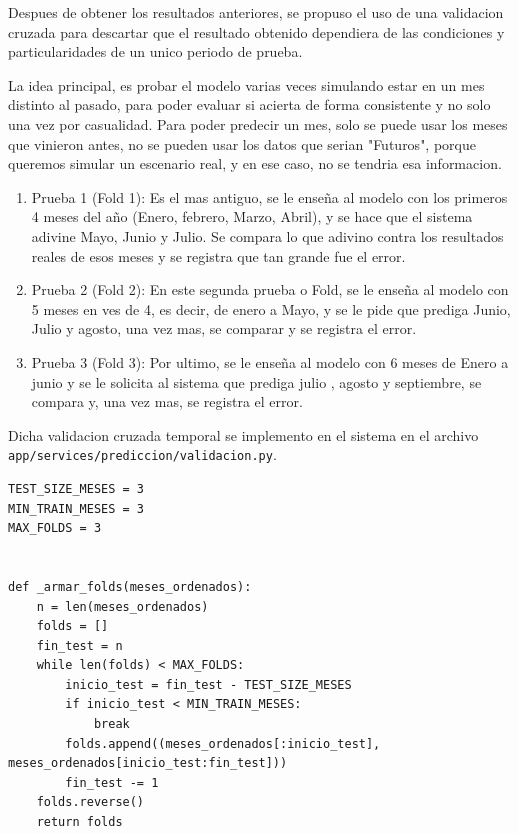 Despues de obtener los resultados anteriores, se propuso el uso de una validacion cruzada para descartar que el resultado obtenido dependiera de las condiciones y particularidades de un unico periodo de prueba.

La idea principal, es probar el modelo varias veces simulando estar en un mes distinto al pasado, para poder evaluar si acierta de forma consistente y no solo una vez por casualidad. Para poder predecir un mes, solo se puede usar los meses que vinieron antes, no se pueden usar los datos que serian "Futuros", porque queremos simular un escenario real, y en ese caso, no se tendria esa informacion.


\begin{enumerate}
    \item Prueba 1 (Fold 1): Es el mas antiguo, se le enseña al modelo con los primeros 4 meses del año (Enero, febrero, Marzo, Abril), y se hace que el sistema adivine Mayo, Junio y Julio. Se compara lo que adivino contra los resultados reales de esos meses y se registra que tan grande fue el error.
    \item Prueba 2 (Fold 2): En este segunda prueba o Fold, se le enseña al modelo con 5 meses en ves de 4, es decir, de enero a Mayo, y se le pide que prediga Junio, Julio y agosto, una vez mas, se comparar y se registra el error.
    \item Prueba 3 (Fold 3): Por ultimo, se le enseña al modelo con 6 meses de Enero a junio y se le solicita al sistema que prediga julio , agosto y septiembre, se compara y, una vez mas, se registra el error.
\end{enumerate}


Dicha validacion cruzada temporal se implemento en el sistema en el archivo \texttt{app/services/prediccion/validacion.py}.

\label{lst:validacion_folds}
\begin{verbatim}
TEST_SIZE_MESES = 3
MIN_TRAIN_MESES = 3
MAX_FOLDS = 3


def _armar_folds(meses_ordenados):
    n = len(meses_ordenados)
    folds = []
    fin_test = n
    while len(folds) < MAX_FOLDS:
        inicio_test = fin_test - TEST_SIZE_MESES
        if inicio_test < MIN_TRAIN_MESES:
            break
        folds.append((meses_ordenados[:inicio_test], meses_ordenados[inicio_test:fin_test]))
        fin_test -= 1
    folds.reverse()
    return folds
\end{verbatim}

